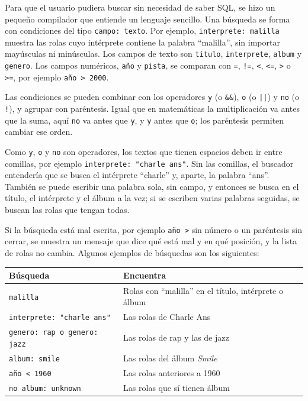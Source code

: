 \documentclass[12pt,letterpaper]{article}
\begin{document}
Para que el usuario pudiera buscar sin necesidad de saber SQL, se hizo un
pequeño compilador que entiende un lenguaje sencillo. Una búsqueda se
forma con condiciones del tipo \texttt{campo: texto}. Por ejemplo,
\texttt{interprete: malilla} muestra las rolas cuyo intérprete contiene la
palabra ``malilla'', sin importar mayúsculas ni minúsculas. Los campos de
texto son \texttt{titulo}, \texttt{interprete}, \texttt{album} y
\texttt{genero}. Los campos numéricos, \texttt{año} y \texttt{pista}, se
comparan con \texttt{=}, \texttt{!=}, \texttt{<}, \texttt{<=}, \texttt{>}
o \texttt{>=}, por ejemplo \texttt{año > 2000}.

Las condiciones se pueden combinar con los operadores \texttt{y} (o
\texttt{\&\&}), \texttt{o} (o \texttt{||}) y \texttt{no} (o \texttt{!}),
y agrupar con paréntesis. Igual que en matemáticas la multiplicación va
antes que la suma, aquí \texttt{no} va antes que \texttt{y}, y \texttt{y}
antes que \texttt{o}; los paréntesis permiten cambiar ese orden.

Como \texttt{y}, \texttt{o} y \texttt{no} son operadores, los textos que
tienen espacios deben ir entre comillas, por ejemplo
\texttt{interprete: "charle ans"}. Sin las comillas, el buscador entendería
que se busca el intérprete ``charle'' y, aparte, la palabra ``ans''.
También se puede escribir una palabra sola, sin campo, y entonces se busca
en el título, el intérprete y el álbum a la vez; si se escriben varias
palabras seguidas, se buscan las rolas que tengan todas.

Si la búsqueda está mal escrita, por ejemplo \texttt{año >} sin número o
un paréntesis sin cerrar, se muestra un mensaje que dice qué está mal y en
qué posición, y la lista de rolas no cambia. Algunos ejemplos de
búsquedas son los siguientes:

\begin{center}
\begin{tabular}{|l|l|}
\hline
\textbf{Búsqueda} & \textbf{Encuentra} \\
\hline
\texttt{malilla} & Rolas con ``malilla'' en el título, intérprete o álbum \\
\texttt{interprete: "charle ans"} & Las rolas de Charle Ans \\
\texttt{genero: rap o genero: jazz} & Las rolas de rap y las de jazz \\
\texttt{album: smile} & Las rolas del álbum \emph{Smile} \\
\texttt{año < 1960} & Las rolas anteriores a 1960 \\
\texttt{no album: unknown} & Las rolas que sí tienen álbum \\
\hline
\end{tabular}
\end{center}
\end{document}
